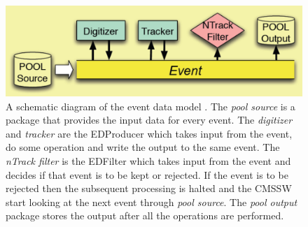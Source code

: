 \begin{figure}
  \begin{center}
  \includegraphics[width=0.75\linewidth]{Experiment/CMS/Image/cms_edm.pdf}
	  \caption{A schematic diagram of the event data model \cite{cmsEDM}. 
	  The {\em pool source} is a package that provides the input 
	  data for every event. The {\em digitizer} and {\em tracker } are the 
	  EDProducer which takes input from the event, do some operation and 
	  write the output to the same event. The {\em nTrack filter} is the
	  EDFilter which takes input from the event and decides if that event 
	  is to be kept or rejected. If the event is to be rejected then the
	  subsequent processing is halted and the CMSSW start looking at the next
	  event through {\em pool source}. The {\em pool output} package stores
	  the output after all the operations are performed.}
  \label{fig:cms_edm}
  \end{center}
\end{figure}

